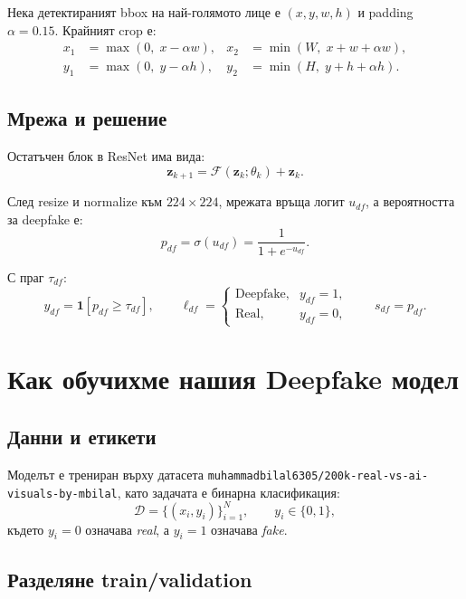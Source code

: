 \documentclass[12pt,a4paper]{article}
\begin{document}
Нека детектираният bbox на най-голямото лице е $(x,y,w,h)$ и padding $\alpha=0.15$.
Крайният crop е:
\begin{align}
x_1 &= \max(0,\; x-\alpha w), & x_2 &= \min(W,\; x+w+\alpha w), \\
y_1 &= \max(0,\; y-\alpha h), & y_2 &= \min(H,\; y+h+\alpha h).
\end{align}

\subsection{Мрежа и решение}

Остатъчен блок в ResNet има вида:
\begin{equation}
\mathbf{z}_{k+1} = \mathcal{F}(\mathbf{z}_k;\theta_k) + \mathbf{z}_k.
\end{equation}

След resize и normalize към $224\times224$, мрежата връща логит $u_{df}$,
а вероятността за deepfake е:
\begin{equation}
p_{df} = \sigma(u_{df}) = \frac{1}{1+e^{-u_{df}}}.
\end{equation}

С праг $\tau_{df}$:
\begin{equation}
y_{df} = \mathbf{1}[p_{df} \ge \tau_{df}], \qquad
\ell_{df} =
\begin{cases}
\text{Deepfake}, & y_{df}=1,\\
\text{Real}, & y_{df}=0,
\end{cases}
\qquad s_{df}=p_{df}.
\end{equation}

\section{Как обучихме нашия Deepfake модел}

\subsection{Данни и етикети}

Моделът е трениран върху датасета
\texttt{muhammadbilal6305/200k-real-vs-ai-visuals-by-mbilal},
като задачата е бинарна класификация:
\begin{equation}
\mathcal{D} = \{(x_i, y_i)\}_{i=1}^{N}, \qquad y_i \in \{0,1\},
\end{equation}
където $y_i=0$ означава \textit{real}, а $y_i=1$ означава \textit{fake}.

\subsection{Разделяне train/validation}
\end{document}
